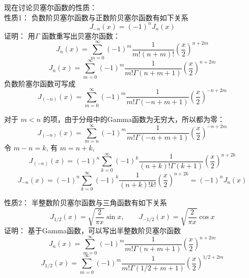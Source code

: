 \begin{frame}
	现在讨论贝塞尔函数的性质：\\
	\alert{性质1：} 负数阶贝塞尔函数与正数阶贝塞尔函数有如下关系
	\begin{equation*}
		J_{-n}(x)=(-1)^n J_n(x)
	\end{equation*}	
	\alert{证明：}  
	用$\Gamma$ 函数重写出贝塞尔函数：
	\begin{equation*}
		J_n(x) = \sum\limits_{m=0}^{\infty} (-1)^m  \frac{1}{m! (n+m) ! } (\frac{x}{2})^{n+2m} 
	\end{equation*}	
	\begin{equation*}
		J_n(x) = \sum\limits_{m=0}^{\infty} (-1)^m  \frac{1}{m! \Gamma(n+m+1) } (\frac{x}{2})^{n+2m} 
	\end{equation*}	
	负数阶塞尔函数可写成
	\begin{equation*}
		J_{(-n)}(x) = \sum\limits_{m=0}^{\infty} (-1)^m  \frac{1}{m! \Gamma(-n+m+1) } (\frac{x}{2})^{-n+2m} 
	\end{equation*}	
\end{frame}	

\begin{frame}
	对于 $m<n$ 的项，由于分母中的Gamma函数为无穷大，所以都为零：
	\begin{equation*}
		J_{(-n)}(x) = \sum\limits_{m=n}^{\infty} (-1)^m  \frac{1}{m! \Gamma(-n+m+1) } (\frac{x}{2})^{-n+2m} 
	\end{equation*}	
	令 $m-n=k$, 有 $m=n+k $, 
	\begin{equation*}
		J_{(-n)}(x) = (-1)^n\sum\limits_{k=0}^{\infty} (-1)^k  \frac{1}{(n+k)! \Gamma(k+1) } (\frac{x}{2})^{n+2k} 
	\end{equation*}	
	\begin{equation*}
		J_{-n} (x) = (-1)^n\sum\limits_{k=0}^{\infty} (-1)^k  \frac{1}{(n+k)! k! } (\frac{x}{2})^{n+2k} =(-1)^n J_{n} (x)
	\end{equation*}	
\end{frame}	

\begin{frame}
	\alert{性质2：} 半整数阶贝塞尔函数与三角函数有如下关系
	\begin{equation*}
		J_{1/2} (x) =\sqrt{\frac{2}{\pi x}} \sin x,  \qquad  J_{-1/2} (x) =\sqrt{\frac{2}{\pi x}} \cos x
	\end{equation*}	
	\alert{证明：}  基于Gamma函数，可以写出半整数阶贝塞尔函数
	\begin{equation*}
		J_n(x) = \sum\limits_{m=0}^{\infty} (-1)^m  \frac{1}{m! \Gamma(n+m+1) } (\frac{x}{2})^{n+2m} 
	\end{equation*}	
	\begin{equation*}
		J_{1/2}(x) = \sum\limits_{m=0}^{\infty} (-1)^m  \frac{1}{m! \Gamma(1/2+m+1) } (\frac{x}{2})^{1/2+2m} 
	\end{equation*}	
\end{frame}	

